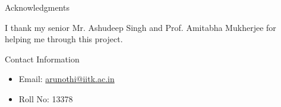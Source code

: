 \documentclass[final,hyperref={pdfpagelabels=false}]{beamer}
\begin{document}
\begin{frame}[t]
\begin{columns}[t]
\begin{column}{.465\textwidth}
\begin{block}{Acknowledgments}

I thank my senior Mr. Ashudeep Singh and Prof. Amitabha Mukherjee for helping me through this project. 

\end{block}



\begin{block}{Contact Information}

\begin{itemize}
\item Email: \href{mailto:arunothi@iitk.ac.in}{arunothi@iitk.ac.in}
\item Roll No: 13378
\end{itemize}

\end{block}


\end{column} %

\begin{column}{.015\textwidth}\end{column} %

\end{columns} %

\end{frame} %
\end{document}
